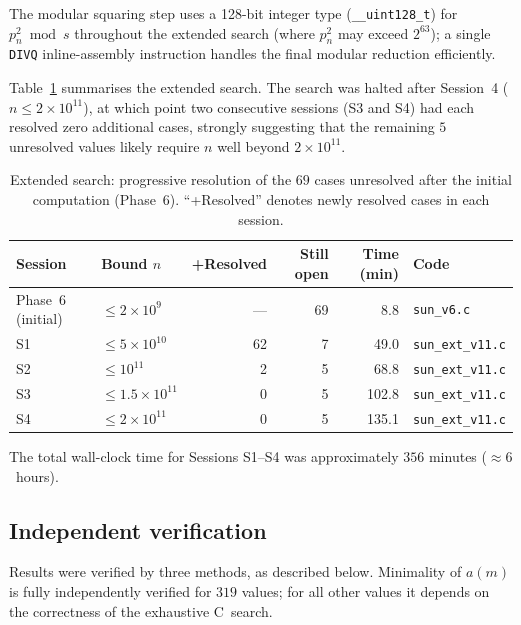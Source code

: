 \documentclass{amsart}
\theoremstyle{definition}
\theoremstyle{remark}
\numberwithin{equation}{section}
\begin{document}
The modular squaring step uses a 128-bit integer type
(\texttt{\_\_uint128\_t}) for $p_n^2 \bmod s$ throughout the
extended search (where $p_n^2$ may exceed $2^{63}$);
a single \texttt{DIVQ} inline-assembly instruction handles the
final modular reduction efficiently.

Table~\ref{tab:extended} summarises the extended search.
The search was halted after Session~4 ($n \leq 2 \times 10^{11}$),
at which point two consecutive sessions (S3 and S4) had each resolved
zero additional cases, strongly suggesting that the remaining $5$
unresolved values likely require $n$ well beyond $2 \times 10^{11}$.

\begin{table}[ht]
	\centering
	\caption{Extended search: progressive resolution of the $69$ cases
		unresolved after the initial computation (Phase~6).
		``+Resolved'' denotes newly resolved cases in
		each session.}
	\label{tab:extended}
	\footnotesize
	\begin{tabular}{llrrrl}
		\toprule
		Session & Bound $n$ & +Resolved & Still open & Time (min) & Code \\
		\midrule
		Phase~6 (initial) & $\leq 2 \times 10^9$   & --- & 69 &  8.8 & \texttt{sun\_v6.c} \\
		S1                & $\leq 5 \times 10^{10}$ &  62 &  7 & 49.0 & \texttt{sun\_ext\_v11.c} \\
		S2                & $\leq 10^{11}$          &   2 &  5 & 68.8 & \texttt{sun\_ext\_v11.c} \\
		S3                & $\leq 1.5 \times 10^{11}$ & 0 &  5 & 102.8 & \texttt{sun\_ext\_v11.c} \\
		S4                & $\leq 2 \times 10^{11}$ &   0 &  5 & 135.1 & \texttt{sun\_ext\_v11.c} \\
		\bottomrule
	\end{tabular}
\end{table}

The total wall-clock time for Sessions S1--S4 was approximately
$356$ minutes ($\approx 6$~hours).

\subsection{Independent verification}
\label{sec:verification}

Results were verified by three methods, as described below.
Minimality of $a(m)$ is fully independently verified for $319$
values; for all other values it depends on the correctness of the
exhaustive C~search.
\end{document}
